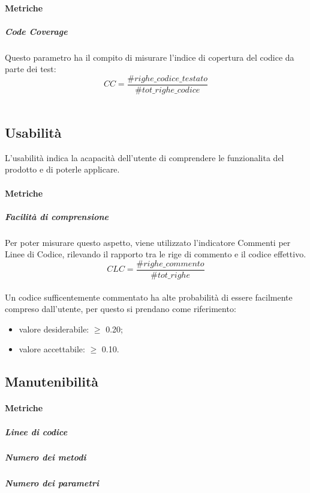 \paragraph{Metriche}
\subparagraph{Code Coverage}
Questo parametro ha il compito di misurare l'indice di copertura del codice da parte dei test: \\
\[ CC = \frac{\#righe\_codice\_testato}{\#tot\_righe\_codice}\] \\
\begin{itemize}
\end{itemize}
\subsection{Usabilità}
L'usabilità indica la acapacità dell'utente di comprendere le funzionalita del prodotto e di poterle applicare.
\paragraph{Metriche}
\subparagraph{Facilità di comprensione}
Per poter misurare questo aspetto, viene utilizzato l'indicatore Commenti per Linee di Codice, rilevando  il rapporto tra le rige di commento e il codice effettivo.
\[ CLC = \frac{\#righe\_commento}{\#tot\_righe}\] \\
Un codice sufficentemente commentato ha alte probabilità di essere facilmente compreso dall'utente, per questo si prendano come riferimento:
\begin{itemize}
\item valore desiderabile: $\geq$ 0.20;
\item valore accettabile: $\geq$ 0.10.
\end{itemize}

\subsection{Manutenibilità}
\paragraph{Metriche}
\subparagraph{Linee di codice}
\subparagraph{Numero dei metodi}
\subparagraph{Numero dei parametri}
